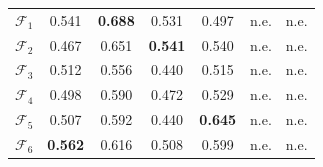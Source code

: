 \documentclass[pdflatex,sn-nature]{sn-jnl}
\begin{document}
\begin{appendices}
\begin{table}[p]
\begin{tabular}{@{}l cc cc cc@{}}
$\mathcal{F}_1$ & 0.541 & \textbf{0.688} & 0.531 & 0.497 & n.e. & n.e. \\
$\mathcal{F}_2$ & 0.467 & 0.651 & \textbf{0.541} & 0.540 & n.e. & n.e. \\
$\mathcal{F}_3$ & 0.512 & 0.556 & 0.440 & 0.515 & n.e. & n.e. \\
$\mathcal{F}_4$ & 0.498 & 0.590 & 0.472 & 0.529 & n.e. & n.e. \\
$\mathcal{F}_5$ & 0.507 & 0.592 & 0.440 & \textbf{0.645} & n.e. & n.e. \\
$\mathcal{F}_6$ & \textbf{0.562} & 0.616 & 0.508 & 0.599 & n.e. & n.e. \\
\bottomrule
\end{tabular}
\end{table}

\clearpage


\end{appendices}
\end{document}
